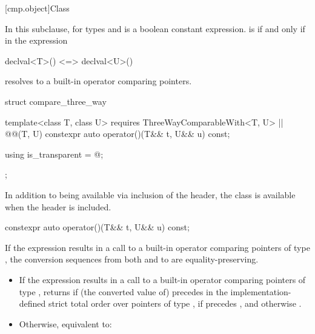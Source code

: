 [cmp.object]{Class }

\pnum
In this subclause, 
for types  and  is a boolean constant expression.
 is 
if and only if \tcode{<=>} in the expression
\begin{codeblock}
declval<T>() <=> declval<U>()
\end{codeblock}
resolves to a built-in operator comparing pointers.

\begin{codeblock}
struct compare_three_way {
  template<class T, class U>
    requires ThreeWayComparableWith<T, U> || @@(T, U)
  constexpr auto operator()(T&& t, U&& u) const;

  using is_transparent = @\unspec@;
};
\end{codeblock}

\pnum
In addition to being available via inclusion of the  header,
the class  is available
when the header  is included.

\begin{itemdecl}
constexpr auto operator()(T&& t, U&& u) const;
\end{itemdecl}

\begin{itemdescr}
\pnum
\expects
If the expression  results in
a call to a built-in operator \tcode{<=>} comparing pointers of type ,
the conversion sequences from both  and  to 
are equality-preserving.

\pnum
\effects
\begin{itemize}
\item
  If the expression  results in
  a call to a built-in operator \tcode{<=>} comparing pointers of type ,
  returns 
  if (the converted value of)  precedes 
  in the implementation-defined strict total order
  over pointers of type ,
  if  precedes , and
  otherwise .
\item
  Otherwise, equivalent to: 
\end{itemize}
\end{itemdescr}

